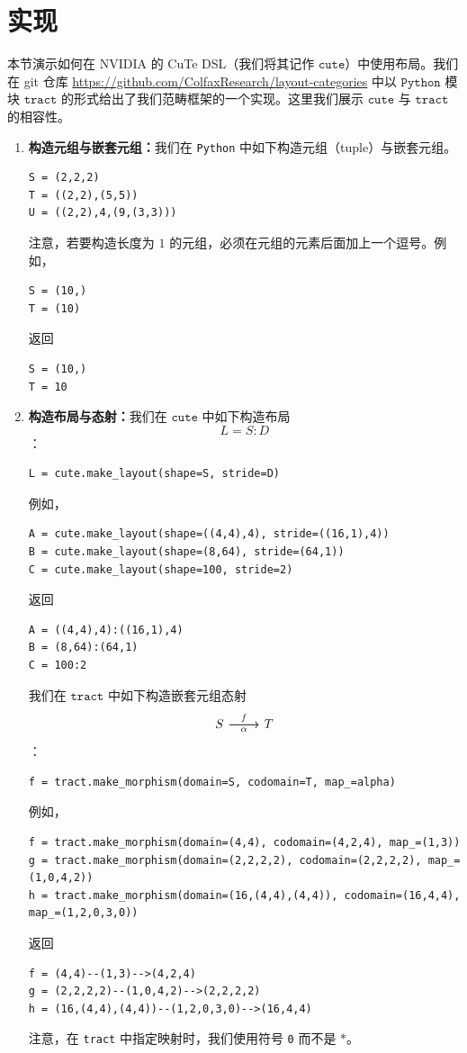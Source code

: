 \clearpage

\section{实现} \label{implementationsection}
本节演示如何在 NVIDIA 的 CuTe DSL（我们将其记作 $\texttt{cute}$）中使用布局。我们在 git 仓库 \url{https://github.com/ColfaxResearch/layout-categories} 中以 $\texttt{Python}$ 模块 $\texttt{tract}$ 的形式给出了我们范畴框架的一个实现。这里我们展示 $\texttt{cute}$ 与 $\texttt{tract}$ 的相容性。

\begin{enumerate}[left=0pt]
\item {\bf 构造元组与嵌套元组：}我们在 \texttt{Python} 中如下构造元组（tuple）与嵌套元组。
\begin{lstlisting}[language=cutedsl]
S = (2,2,2)
T = ((2,2),(5,5))
U = ((2,2),4,(9,(3,3)))
\end{lstlisting}
注意，若要构造长度为 $1$ 的元组，必须在元组的元素后面加上一个逗号。例如，
\begin{lstlisting}[language=cutedsl]
S = (10,)
T = (10)
\end{lstlisting}
返回
\begin{lstlisting}[language=cutedsl]
S = (10,)
T = 10
\end{lstlisting}
\item {\bf 构造布局与态射：}我们在 $\texttt{cute}$ 中如下构造布局
\[
L = S:D
\]
：
\begin{lstlisting}[language=cutedsl]
L = cute.make_layout(shape=S, stride=D)
\end{lstlisting}
例如，
\begin{lstlisting}[language=cutedsl]
A = cute.make_layout(shape=((4,4),4), stride=((16,1),4))
B = cute.make_layout(shape=(8,64), stride=(64,1))
C = cute.make_layout(shape=100, stride=2)
\end{lstlisting}
返回
\begin{lstlisting}[language=cutedsl]
A = ((4,4),4):((16,1),4)
B = (8,64):(64,1)
C = 100:2
\end{lstlisting}
我们在 $\texttt{tract}$ 中如下构造嵌套元组态射
\[\begin{tikzcd}
S \ar[r,"f"] \ar[r,swap,"\alpha"] & T
\end{tikzcd} \]
：
\begin{lstlisting}[language=cutedsl]
f = tract.make_morphism(domain=S, codomain=T, map_=alpha)
\end{lstlisting}
例如，
\begin{lstlisting}[language=cutedsl]
f = tract.make_morphism(domain=(4,4), codomain=(4,2,4), map_=(1,3))
g = tract.make_morphism(domain=(2,2,2,2), codomain=(2,2,2,2), map_=(1,0,4,2))
h = tract.make_morphism(domain=(16,(4,4),(4,4)), codomain=(16,4,4), map_=(1,2,0,3,0))
\end{lstlisting}
返回
\begin{lstlisting}[language=cutedsl]
f = (4,4)--(1,3)-->(4,2,4)
g = (2,2,2,2)--(1,0,4,2)-->(2,2,2,2)
h = (16,(4,4),(4,4))--(1,2,0,3,0)-->(16,4,4)
\end{lstlisting}
注意，在 \texttt{tract} 中指定映射时，我们使用符号 \texttt{0} 而不是 $\ast$。


\end{enumerate}
